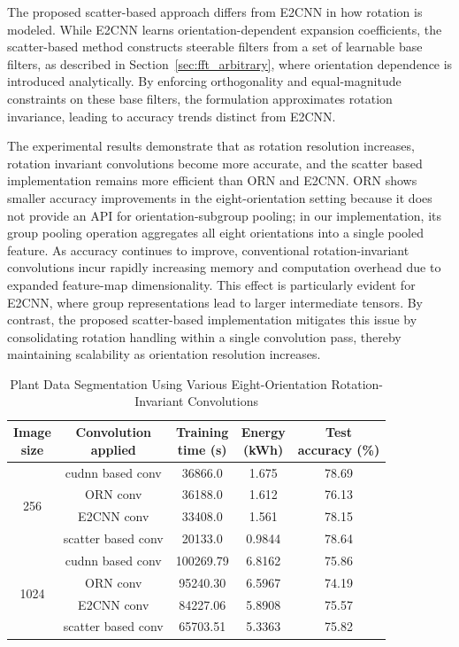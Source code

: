 The proposed scatter-based approach differs from E2CNN in how rotation is modeled. While E2CNN learns orientation-dependent expansion coefficients, the scatter-based method constructs steerable filters from a set of learnable base filters, as described in Section~\ref{sec:fft_arbitrary}, where orientation dependence is introduced analytically. By enforcing orthogonality and equal-magnitude constraints on these base filters, the formulation approximates rotation invariance, leading to accuracy trends distinct from E2CNN.

The experimental results demonstrate that as rotation resolution increases, rotation invariant convolutions become more accurate, and the scatter based implementation remains more efficient than ORN and E2CNN. ORN shows smaller accuracy improvements in the eight-orientation setting because it does not provide an API for orientation-subgroup pooling; in our implementation, its group pooling operation aggregates all eight orientations into a single pooled feature.
As accuracy continues to improve, conventional rotation-invariant convolutions incur rapidly increasing memory and computation overhead due to expanded feature-map dimensionality.
This effect is particularly evident for E2CNN, where group representations lead to larger intermediate tensors.
By contrast, the proposed scatter-based implementation mitigates this issue by consolidating rotation handling within a single convolution pass, thereby maintaining scalability as orientation resolution increases.

\begin{table}[ht]
\centering
\caption{Plant Data Segmentation Using Various Eight-Orientation Rotation-Invariant Convolutions}
\renewcommand{\arraystretch}{1.2}
\begin{tabular}{c|c|c|c|c} 
\hline\hline
\shortstack{Image\\size} & 
\shortstack{Convolution\\applied} & 
\shortstack{Training\\time (s)} &  
\shortstack{Energy\\(kWh)} &  
\shortstack{Test\\accuracy (\%)} \\ 
\hline
\hline
\multirow{4}{*}{256} 
 & cudnn based conv    & 36866.0  & 1.675  & 78.69 \\ \cline{2-5}
 & ORN conv            & 36188.0  & 1.612  & 76.13 \\ \cline{2-5}
 & E2CNN conv          & 33408.0  & 1.561  &78.15  \\ \cline{2-5}
 & scatter based conv  & 20133.0  & 0.9844  &78.64  \\
\hline 
\multirow{4}{*}{1024} 
  & cudnn based conv    &100269.79  &6.8162  &75.86 \\ \cline{2-5}
  & ORN conv            &95240.30   &6.5967  &74.19 \\ \cline{2-5}
  & E2CNN conv          &84227.06   &5.8908  &75.57 \\ \cline{2-5}
  & scatter based conv  &65703.51   &5.3363  &75.82 \\
\hline

\end{tabular}
\label{tab:eight-plant}
\end{table}

